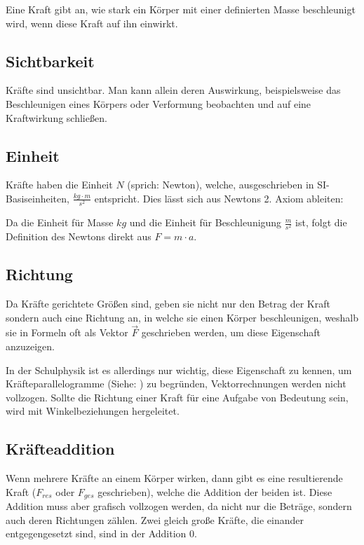 Eine Kraft gibt an, wie stark ein Körper mit einer definierten Masse beschleunigt wird, wenn diese Kraft auf ihn einwirkt. 


\subsection{Sichtbarkeit}

Kräfte sind unsichtbar. Man kann allein deren Auswirkung, beispielsweise das Beschleunigen eines Körpers oder Verformung beobachten und auf eine Kraftwirkung schließen.


\subsection{Einheit}

Kräfte haben die Einheit $N$ (sprich: \glqq Newton\grqq ), welche, ausgeschrieben in SI-Basiseinheiten, $\frac{kg \cdot m}{s^2}$ entspricht. Dies lässt sich aus Newtons 2. Axiom ableiten:

Da die Einheit für Masse $kg$ und die Einheit für Beschleunigung $\frac{m}{s^2}$ ist, folgt die Definition des Newtons direkt aus $F = m \cdot a$.


\subsection{Richtung}

Da Kräfte gerichtete Größen sind, geben sie nicht nur den Betrag der Kraft sondern auch eine Richtung an, in welche sie einen Körper beschleunigen, weshalb sie in Formeln oft als Vektor $\vec{F}$ geschrieben werden, um diese Eigenschaft anzuzeigen.

\begin{Anmerkung}
In der Schulphysik ist es allerdings nur wichtig, diese Eigenschaft zu kennen, um Kräfteparallelogramme (Siehe: ) zu begründen, Vektorrechnungen werden nicht vollzogen. Sollte die Richtung einer Kraft für eine Aufgabe von Bedeutung sein, wird mit Winkelbeziehungen hergeleitet.
\end{Anmerkung}

\subsection{Kräfteaddition} \label{subsec:kraefteaddition}

Wenn mehrere Kräfte an einem Körper wirken, dann gibt es eine resultierende Kraft ($F_{res}$ oder $F_{ges}$ geschrieben), welche die Addition der beiden ist. Diese Addition muss aber grafisch vollzogen werden, da nicht nur die Beträge, sondern auch deren Richtungen zählen. Zwei gleich große Kräfte, die einander entgegengesetzt sind, sind in der Addition $0$.

